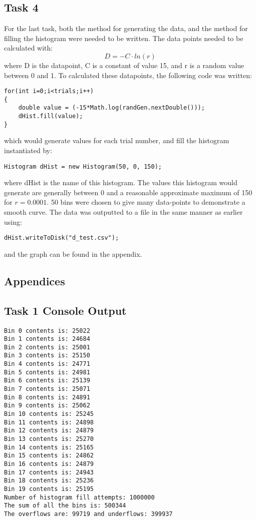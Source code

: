 \documentclass{article}
\begin{document}
\begin{multicols}{2}
\section{Task 4}
For the last task, both the method for generating the data, and the method for filling the histogram were needed to be written. The data points needed to be calculated with:
\begin{equation}
D = -C \cdot ln(r)
\end{equation}
where D is the datapoint, C is a constant of value 15, and r is a random value between 0 and 1. To calculated these datapoints, the following code was written:
\begin{lstlisting}
for(int i=0;i<trials;i++)  
{
	double value = (-15*Math.log(randGen.nextDouble()));
	dHist.fill(value);
}
\end{lstlisting}
which would generate values for each trial number, and fill the histogram instantiated by:
\begin{lstlisting}
Histogram dHist = new Histogram(50, 0, 150);
\end{lstlisting}
where dHist is the name of this histogram. The values this histogram would generate are generally between 0 and a reasonable approximate maximum of 150 for $r = 0.0001$. 50 bins were chosen to give many data-points to demonstrate a smooth curve. The data was outputted to a file in the same manner as earlier using:
\begin{lstlisting}
dHist.writeToDisk("d_test.csv");
\end{lstlisting}
and the graph can be found in the appendix.
\end{multicols}
\newpage
\begin{center}

\section{Appendices}
\subsection{Task 1 Console Output}
\begin{lstlisting}
Bin 0 contents is: 25022
Bin 1 contents is: 24684
Bin 2 contents is: 25001
Bin 3 contents is: 25150
Bin 4 contents is: 24771
Bin 5 contents is: 24981
Bin 6 contents is: 25139
Bin 7 contents is: 25071
Bin 8 contents is: 24891
Bin 9 contents is: 25062
Bin 10 contents is: 25245
Bin 11 contents is: 24898
Bin 12 contents is: 24879
Bin 13 contents is: 25270
Bin 14 contents is: 25165
Bin 15 contents is: 24862
Bin 16 contents is: 24879
Bin 17 contents is: 24943
Bin 18 contents is: 25236
Bin 19 contents is: 25195
Number of histogram fill attempts: 1000000
The sum of all the bins is: 500344
The overflows are: 99719 and underflows: 399937
\end{lstlisting}




\end{center}
\end{document}
